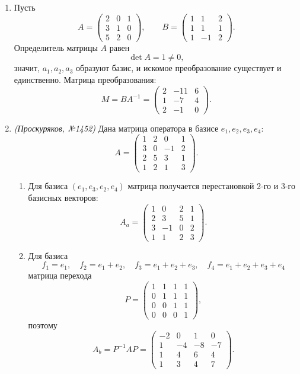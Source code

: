 \begin{enumerate}
\item
Пусть
\[
A=\begin{pmatrix}
2&0&1\\
3&1&0\\
5&2&0
\end{pmatrix},\qquad
B=\begin{pmatrix}
1&1&2\\
1&1&1\\
1&-1&2
\end{pmatrix}.
\]
Определитель матрицы \(A\) равен
\[
\det A=1\ne 0,
\]
значит, \(a_1,a_2,a_3\) образуют базис, и искомое преобразование существует и единственно.
Матрица преобразования:
\[
M=BA^{-1}
=\begin{pmatrix}
2&-11&6\\
1&-7&4\\
2&-1&0
\end{pmatrix}.
\]

\item \textit{(Проскуряков, №1452)}
Дана матрица оператора в базисе \(e_1,e_2,e_3,e_4\):
\[
A=\begin{pmatrix}
1&2&0&1\\
3&0&-1&2\\
2&5&3&1\\
1&2&1&3
\end{pmatrix}.
\]

\begin{enumerate}[label=\alph*)]
\item Для базиса \((e_1,e_3,e_2,e_4)\) матрица получается перестановкой 2-го и 3-го базисных векторов:
\[
A_a=\begin{pmatrix}
1&0&2&1\\
2&3&5&1\\
3&-1&0&2\\
1&1&2&3
\end{pmatrix}.
\]

\item Для базиса
\[
f_1=e_1,\quad f_2=e_1+e_2,\quad f_3=e_1+e_2+e_3,\quad f_4=e_1+e_2+e_3+e_4
\]
матрица перехода
\[
P=\begin{pmatrix}
1&1&1&1\\
0&1&1&1\\
0&0&1&1\\
0&0&0&1
\end{pmatrix},
\]
поэтому
\[
A_b=P^{-1}AP=
\begin{pmatrix}
-2&0&1&0\\
1&-4&-8&-7\\
1&4&6&4\\
1&3&4&7
\end{pmatrix}.
\]
\end{enumerate}


\end{enumerate}
